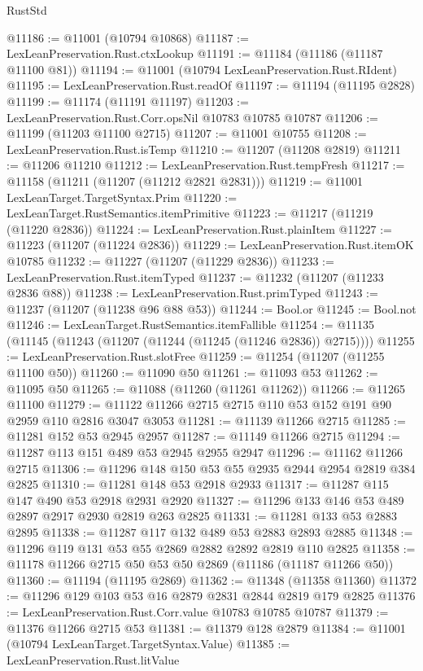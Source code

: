 \begin{lexlean}{RustStd}
\begin{coremodule}
@11186 := @11001 (@10794 @10868)
@11187 := LexLeanPreservation.Rust.ctxLookup
@11191 := @11184 (@11186 (@11187 @11100 @81))
@11194 := @11001 (@10794 LexLeanPreservation.Rust.RIdent)
@11195 := LexLeanPreservation.Rust.readOf
@11197 := @11194 (@11195 @2828)
@11199 := @11174 (@11191 @11197)
@11203 := LexLeanPreservation.Rust.Corr.opsNil @10783 @10785 @10787
@11206 := @11199 (@11203 @11100 @2715)
@11207 := @11001 @10755
@11208 := LexLeanPreservation.Rust.isTemp
@11210 := @11207 (@11208 @2819)
@11211 := @11206 @11210
@11212 := LexLeanPreservation.Rust.tempFresh
@11217 := @11158 (@11211 (@11207 (@11212 @2821 @2831)))
@11219 := @11001 LexLeanTarget.TargetSyntax.Prim
@11220 := LexLeanTarget.RustSemantics.itemPrimitive
@11223 := @11217 (@11219 (@11220 @2836))
@11224 := LexLeanPreservation.Rust.plainItem
@11227 := @11223 (@11207 (@11224 @2836))
@11229 := LexLeanPreservation.Rust.itemOK @10785
@11232 := @11227 (@11207 (@11229 @2836))
@11233 := LexLeanPreservation.Rust.itemTyped
@11237 := @11232 (@11207 (@11233 @2836 @88))
@11238 := LexLeanPreservation.Rust.primTyped
@11243 := @11237 (@11207 (@11238 @96 @88 @53))
@11244 := Bool.or
@11245 := Bool.not
@11246 := LexLeanTarget.RustSemantics.itemFallible
@11254 := @11135 (@11145 (@11243 (@11207 (@11244 (@11245 (@11246 @2836)) @2715))))
@11255 := LexLeanPreservation.Rust.slotFree
@11259 := @11254 (@11207 (@11255 @11100 @50))
@11260 := @11090 @50
@11261 := @11093 @53
@11262 := @11095 @50
@11265 := @11088 (@11260 (@11261 @11262))
@11266 := @11265 @11100
@11279 := @11122 @11266 @2715 @2715 @110 @53 @152 @191 @90 @2959 @110 @2816 @3047 @3053
@11281 := @11139 @11266 @2715
@11285 := @11281 @152 @53 @2945 @2957
@11287 := @11149 @11266 @2715
@11294 := @11287 @113 @151 @489 @53 @2945 @2955 @2947
@11296 := @11162 @11266 @2715
@11306 := @11296 @148 @150 @53 @55 @2935 @2944 @2954 @2819 @384 @2825
@11310 := @11281 @148 @53 @2918 @2933
@11317 := @11287 @115 @147 @490 @53 @2918 @2931 @2920
@11327 := @11296 @133 @146 @53 @489 @2897 @2917 @2930 @2819 @263 @2825
@11331 := @11281 @133 @53 @2883 @2895
@11338 := @11287 @117 @132 @489 @53 @2883 @2893 @2885
@11348 := @11296 @119 @131 @53 @55 @2869 @2882 @2892 @2819 @110 @2825
@11358 := @11178 @11266 @2715 @50 @53 @50 @2869 (@11186 (@11187 @11266 @50))
@11360 := @11194 (@11195 @2869)
@11362 := @11348 (@11358 @11360)
@11372 := @11296 @129 @103 @53 @16 @2879 @2831 @2844 @2819 @179 @2825
@11376 := LexLeanPreservation.Rust.Corr.value @10783 @10785 @10787
@11379 := @11376 @11266 @2715 @53
@11381 := @11379 @128 @2879
@11384 := @11001 (@10794 LexLeanTarget.TargetSyntax.Value)
@11385 := LexLeanPreservation.Rust.litValue

\end{coremodule}
\end{lexlean}
